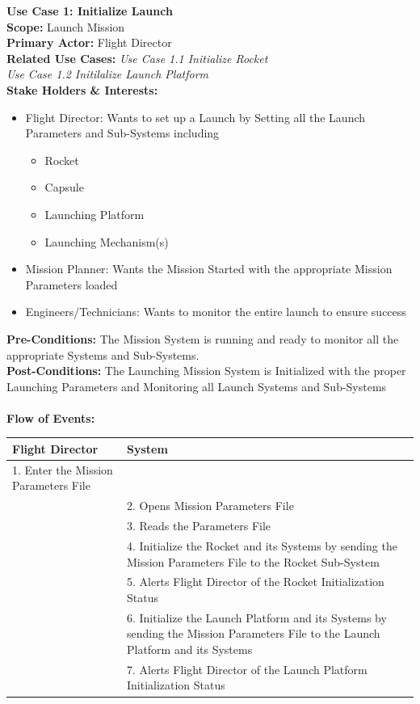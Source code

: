 \documentclass[letterpaper]{article}
\begin{document}
\noindent
\textbf{Use Case 1:  Initialize Launch}\\
\textbf{Scope:  }Launch Mission\\
\textbf{Primary Actor:  }Flight Director\\
\textbf{Related Use Cases:  }\textit{Use Case 1.1 Initialize Rocket}\\
\textit{Use Case 1.2 Initilalize Launch Platform}\\
\textbf{Stake Holders \& Interests:}
\begin{itemize}
   \item Flight Director:  Wants to set up a Launch by Setting all the
      Launch Parameters and Sub-Systems including
      \begin{itemize}
         \item Rocket
         \item Capsule
         \item Launching Platform
         \item Launching Mechanism(s)
      \end{itemize}
   \item Mission Planner:  Wants the Mission Started  with the 
      appropriate Mission Parameters loaded
   \item Engineers/Technicians: Wants to monitor the entire launch to
      ensure success
\end{itemize}
\textbf{Pre-Conditions:  }The Mission System is running and ready to 
monitor all the appropriate Systems and Sub-Systems.\\
\textbf{Post-Conditions:  }The Launching Mission System is Initialized
with the proper Launching Parameters and Monitoring all Launch Systems
and Sub-Systems\\\\
\textbf{Flow of Events:}\\
\begin{tabular}{|p{5.75cm}|p{5.75cm}|}\hline
   \textbf{Flight Director}&\textbf{System}\\\hline
   1.  Enter the Mission Parameters File &\\\hline
   &2.  Opens Mission Parameters File\\\hline
   &3.  Reads the Parameters File\\\hline
   &4.  Initialize the Rocket and its Systems by sending the Mission
        Parameters File to the Rocket Sub-System\\\hline
   &5.  Alerts Flight Director of the Rocket Initialization 
        Status\\\hline
   &6.  Initialize the Launch Platform and its Systems by sending the
        Mission Parameters File to the Launch Platform and its
        Systems\\\hline
   &7.  Alerts Flight Director of the Launch Platform Initialization
        Status\\\hline
\end{tabular}\\\\
\end{document}
